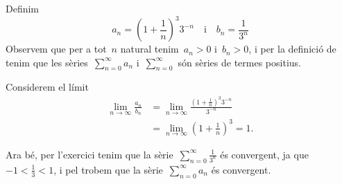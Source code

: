 \documentclass[../analisi-matematica.tex]{subfiles}
\begin{document}
    \begin{solution}
        Definim
        \[
            a_{n}=\left(1+\frac{1}{n}\right)^{3}3^{-n}\quad\text{i}\quad b_{n}=\frac{1}{3^{n}}
        \]
        Observem que per a tot~\(n\) natural tenim~\(a_{n}>0\) i~\(b_{n}>0\), i per la definició de  tenim que les sèries~\(\sum_{n=0}^{\infty}a_{n}\) i~\(\sum_{n=0}^{\infty}\) són sèries de termes positius.

        Considerem el límit
        \begin{align*}
            \lim_{n\to\infty}\frac{a_{n}}{b_{n}}&=\lim_{n\to\infty}\frac{\left(1+\frac{1}{n}\right)^{3}3^{-n}}{3^{-n}}\\
            &=\lim_{n\to\infty}\left(1+\frac{1}{n}\right)^{3}=1.
        \end{align*}

        Ara bé, per l'exercici  tenim que la sèrie~\(\sum_{n=0}^{\infty}\frac{1}{3^{n}}\) és convergent, ja que~\(-1<\frac{1}{3}<1\), i pel  trobem que la sèrie~\(\sum_{n=0}^{\infty}a_{n}\) és convergent.
    \end{solution}
\end{document}
